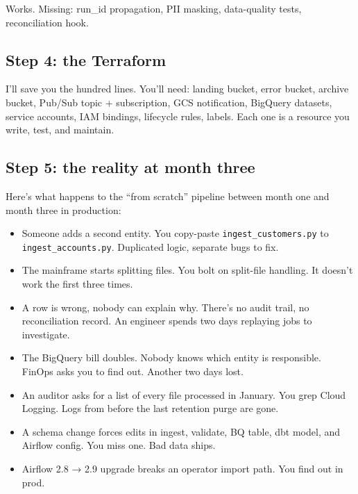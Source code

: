 \documentclass[
  11pt,
  british,
  oneside]{book}
\providecommand{\tightlist}{%
  \setlength{\itemsep}{0pt}\setlength{\parskip}{0pt}}
\begin{document}
Works. Missing: run\_id propagation, PII masking, data-quality tests,
reconciliation hook.

\hypertarget{step-4-the-terraform}{%
\subsection{Step 4: the Terraform}\label{step-4-the-terraform}}

I'll save you the hundred lines. You'll need: landing bucket, error
bucket, archive bucket, Pub/Sub topic + subscription, GCS notification,
BigQuery datasets, service accounts, IAM bindings, lifecycle rules,
labels. Each one is a resource you write, test, and maintain.

\hypertarget{step-5-the-reality-at-month-three}{%
\subsection{Step 5: the reality at month
three}\label{step-5-the-reality-at-month-three}}

Here's what happens to the ``from scratch'' pipeline between month one
and month three in production:

\begin{itemize}
\tightlist
\item
  Someone adds a second entity. You copy-paste
  \texttt{ingest\_customers.py} to \texttt{ingest\_accounts.py}.
  Duplicated logic, separate bugs to fix.
\item
  The mainframe starts splitting files. You bolt on split-file handling.
  It doesn't work the first three times.
\item
  A row is wrong, nobody can explain why. There's no audit trail, no
  reconciliation record. An engineer spends two days replaying jobs to
  investigate.
\item
  The BigQuery bill doubles. Nobody knows which entity is responsible.
  FinOps asks you to find out. Another two days lost.
\item
  An auditor asks for a list of every file processed in January. You
  grep Cloud Logging. Logs from before the last retention purge are
  gone.
\item
  A schema change forces edits in ingest, validate, BQ table, dbt model,
  and Airflow config. You miss one. Bad data ships.
\item
  Airflow 2.8 → 2.9 upgrade breaks an operator import path. You find out
  in prod.
\end{itemize}
\end{document}
